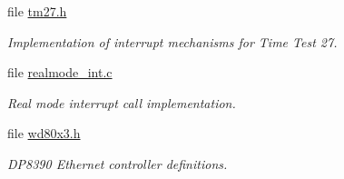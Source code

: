 \begin{DoxyCompactItemize}
file \mbox{\hyperlink{i386_2pc386_2include_2tm27_8h}{tm27.\+h}}
\begin{DoxyCompactList}\small\item\em Implementation of interrupt mechanisms for Time Test 27. \end{DoxyCompactList}\item 
file \mbox{\hyperlink{realmode__int_8c}{realmode\+\_\+int.\+c}}
\begin{DoxyCompactList}\small\item\em Real mode interrupt call implementation. \end{DoxyCompactList}\item 
file \mbox{\hyperlink{include_2libchip_2wd80x3_8h}{wd80x3.\+h}}
\begin{DoxyCompactList}\small\item\em D\+P8390 Ethernet controller definitions. \end{DoxyCompactList}\end{DoxyCompactItemize}
